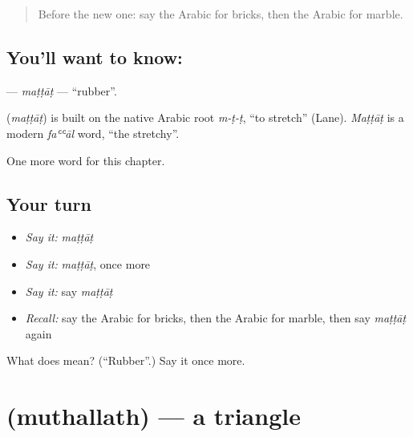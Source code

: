 \label{lesson:AR-C250-mattat}



\begin{quote}
Before the new one: say the Arabic for bricks, then the Arabic for marble.
\end{quote}

\subsection*{You'll want to know: }
\textbf{} — \emph{maṭṭāṭ} — \textquotedblleft{}rubber\textquotedblright{}.

\begin{cousinweb}
\textbf{} (\emph{maṭṭāṭ}) is built on the native Arabic root \emph{m-ṭ-ṭ}, \textquotedblleft{}to stretch\textquotedblright{} (Lane). \emph{Maṭṭāṭ} is a modern \emph{faʿʿāl} word, \textquotedblleft{}the stretchy\textquotedblright{}.
\end{cousinweb}

\begin{grammarlens}[title={What you've built}]
One more word for this chapter.
\end{grammarlens}

\subsection*{Your turn}
\begin{itemize}
\raggedright
  \item \emph{Say it:} \emph{maṭṭāṭ}
  \item \emph{Say it:} \emph{maṭṭāṭ}, once more
  \item \emph{Say it:} say \emph{maṭṭāṭ}
  \item \emph{Recall:} say the Arabic for bricks, then the Arabic for marble, then say \emph{maṭṭāṭ} again
\end{itemize}

\begin{tcolorbox}[breakable,colback=teal!4,colframe=teal!35!black,title={Before you move on}]
What does  mean? (\textquotedblleft{}Rubber\textquotedblright{}.) Say it once more.
\end{tcolorbox}
\section[\texorpdfstring{\ar{مثلث} (muthallath)}{مثلث (muthallath)}]{ (muthallath) — a triangle}

